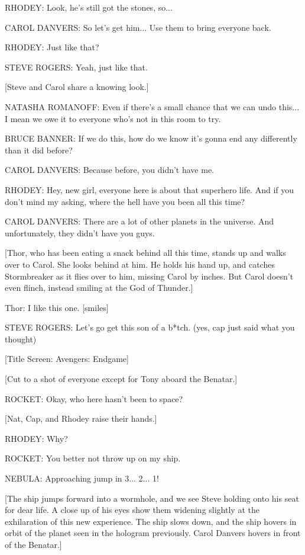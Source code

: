 RHODEY: Look, he's still got the stones, so...

CAROL DANVERS: So let's get him... Use them to bring everyone back.

RHODEY: Just like that?

STEVE ROGERS: Yeah, just like that.

[Steve and Carol share a knowing look.]

NATASHA ROMANOFF: Even if there's a small chance that we can undo this... I mean we owe it to everyone who's not in this room to try.

BRUCE BANNER: If we do this, how do we know it's gonna end any differently than it did before?

CAROL DANVERS: Because before, you didn't have me.

RHODEY: Hey, new girl, everyone here is about that superhero life. And if you don't mind my asking, where the hell have you been all this time?

CAROL DANVERS: There are a lot of other planets in the universe. And unfortunately, they didn't have you guys.

[Thor, who has been eating a snack behind all this time, stands up and walks over to Carol. She looks behind at him. He holds his hand up, and catches Stormbreaker as it flies over to him, missing Carol by inches. But Carol doesn't even flinch, instead smiling at the God of Thunder.]

Thor: I like this one. [smiles]

STEVE ROGERS: Let's go get this son of a b*tch. (yes, cap just said what you thought)

[Title Screen: Avengers: Endgame]

[Cut to a shot of everyone except for Tony aboard the Benatar.]

ROCKET: Okay, who here hasn't been to space?

[Nat, Cap, and Rhodey raise their hands.]

RHODEY: Why?

ROCKET: You better not throw up on my ship.

NEBULA: Approaching jump in 3... 2... 1!

[The ship jumps forward into a wormhole, and we see Steve holding onto his seat for dear life. A close up of his eyes show them widening slightly at the exhilaration of this new experience. The ship slows down, and the ship hovers in orbit of the planet seen in the hologram previously. Carol Danvers hovers in front of the Benatar.]

